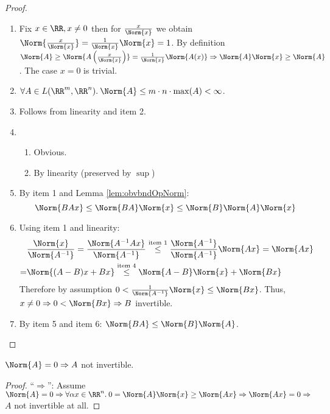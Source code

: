\begin{proof}\ 
 \begin{enumerate}
  \item Fix $x\in\RR, x\neq 0$ then for $\frac{x}{\Norm{x}}$ we obtain $\Norm{\frac{x}{\Norm{x}}}=\frac{1}{\Norm{x}}\Norm{x}=1$. 
  By definition $\Norm{A}\geq \Norm{A\left(\frac{x}{\Norm{x}}\right)}=\frac{1}{\Norm{x}}\Norm{A(x)}\Rightarrow\Norm{A}\Norm{x}\geq\Norm{A}$. The case $x=0$ is trivial. 
  \item $\forall A\in L(\RR^m, \RR^n).\:\Norm{A}\leq m\cdot n\cdot \max(A)<\infty$.
  \item Follows from linearity and item 2.
  \item \begin{enumerate}
   \item Obvious.
   \item By linearity (preserved by $\sup$)
  \end{enumerate}
  \item By item 1 and Lemma \ref{lem:obvbndOpNorm}:
  \begin{equation}
   \label{eqn:bndCompOpNorm}
   \Norm{BAx}\leq \Norm{BA}\Norm{x}\leq \Norm{B}\Norm{A}\Norm{x}
  \end{equation}
  \item Using item 1 and linearity:
  \begin{align*}
   &\frac{\Norm{x}}{\Norm{A^{-1}}}=\frac{\Norm{A^{-1}Ax}}{\Norm{A^{-1}}}\overset{\text{item 1}}{\leq}\frac{\Norm{A^{-1}}}{\Norm{A^{-1}}}\Norm{Ax}=\Norm{Ax}\\
   =&\Norm{(A-B)x+Bx}\overset{\text{item 4}}{\leq}\Norm{A-B}\Norm{x}+\Norm{Bx}
  \end{align*}
  Therefore by assumption $0<\frac{1}{\Norm{A^{-1}}}\Norm{x}\leq\Norm{Bx}$.
  Thus, $x\neq 0\Rightarrow 0<\Norm{Bx}\Rightarrow B$ invertible. 
  \item By item 5 and item 6: $\Norm{BA}\leq\Norm{B}\Norm{A}$.  
 \end{enumerate}
\end{proof}
\begin{lem}
	$\Norm{A}=0\Rightarrow A$ not invertible.
\end{lem}
\begin{proof}
	``$\Rightarrow$'':
	Assume $\Norm{A}=0\Rightarrow \forall \alpha x\in\RR^n.\:0=\Norm{A}\Norm{x}\geq \Norm{Ax}\Rightarrow\Norm{Ax}=0\Rightarrow$ $A$ not invertible at all.
\end{proof}